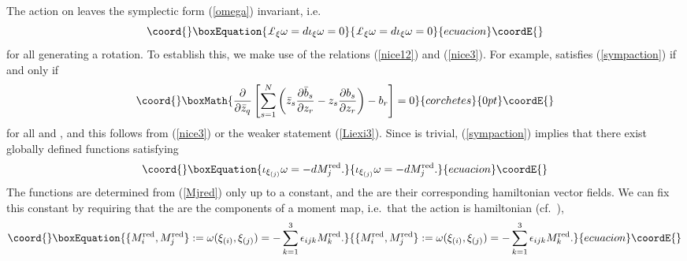 \documentclass[a4paper,11pt]{article}
\begin{document}
The \coordHE{} action on \coordHE{} leaves the symplectic
form (\ref{omega}) invariant, i.e.
\begin{equation}\coord{}\boxEquation{\label{sympaction}
{\rm \pounds}_{\xi}\omega=d\iota_{\xi}\omega=0
}{{\rm \pounds}_{\xi}\omega=d\iota_{\xi}\omega=0
}{ecuacion}\coordE{}\end{equation}
for all \myHighlight{$\xi$}\coordHE{} generating a rotation. To establish this, we make use
of the relations (\ref{nice12}) and (\ref{nice3}). For example,
\coordHE{} satisfies (\ref{sympaction}) if and only if
\[\coord{}\boxMath{
\frac{\partial}{\partial\bar{z}_{q}}\left[
\sum_{s=1}^{N}\left(\bar{z}_{s}\frac{\partial \bar{b}_{s}}{\partial
z_{r}} - {z}_{s}\frac{\partial {b}_{s}}{\partial z_{r}} \right)
-b_{r}\right]=0
}{corchetes}{0pt}\coordE{}\]
for all \coordHE{} and \coordHE{}, and this follows from (\ref{nice3}) or the 
weaker statement (\ref{Liexi3}). Since 
\coordHE{} is trivial, (\ref{sympaction}) 
implies that there exist globally defined functions \coordHE{} 
satisfying
\begin{equation}\coord{}\boxEquation{ \label{Mjred}
\iota_{\xi_{(j)}}\omega=-dM^{\rm red}_{j}.
}{ \iota_{\xi_{(j)}}\omega=-dM^{\rm red}_{j}.
}{ecuacion}\coordE{}\end{equation}
The functions \coordHE{} are determined from (\ref{Mjred})
only up to a constant, and the \coordHE{} are their corresponding
hamiltonian vector fields. We can fix this constant by requiring that
the \coordHE{} are the components of a moment map, i.e.~that the
\coordHE{} action is hamiltonian (cf.~\cite{GS}),
\begin{equation}\coord{}\boxEquation{ \label{hamaction}
\{M^{\rm red}_{i},M^{\rm red}_{j}\}:=\omega(\xi_{(i)},\xi_{(j)})=
-\sum_{k=1}^{3}\epsilon_{ijk}M^{\rm red}_{k}.
}{ \{M^{\rm red}_{i},M^{\rm red}_{j}\}:=\omega(\xi_{(i)},\xi_{(j)})=
-\sum_{k=1}^{3}\epsilon_{ijk}M^{\rm red}_{k}.
}{ecuacion}\coordE{}\end{equation}
\end{document}
